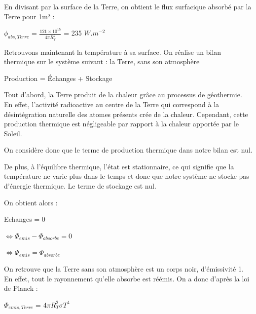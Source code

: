 \documentclass[a4paper, 12pt]{report} %
\begin{document}
En divisant par la surface de la Terre, 
on obtient le flux surfacique absorbé par la Terre pour 1m² :
\begin{center}
$\phi_{abs,Terre}$ = $\frac {121 \times 10^{15}}{4 \pi R_T^{2}}$
= 235 $W.m^{-2}$
\end{center}

\par 
\vspace{\baselineskip}
\vspace{\baselineskip}

Retrouvons maintenant la température à sa surface.
On réalise un bilan thermique sur le système suivant : 
la Terre, sans son atmosphère
\begin{center}
    Production = Échanges + Stockage 
\end{center} \vspace{\baselineskip}

Tout d'abord, la Terre produit de la chaleur grâce au processus de géothermie. En effet, l’activité radioactive au centre de la Terre qui correspond à la désintégration naturelle des atomes présents crée de la chaleur. 
Cependant, cette production thermique est négligeable par rapport à la chaleur apportée par le Soleil. 

\noindent On considère donc que le terme de production thermique dans notre bilan est nul. \vspace{\baselineskip}

De plus, à l’équilibre thermique, l’état est stationnaire, ce qui signifie que la température ne varie plus dans le temps et donc que notre système ne stocke pas d’énergie thermique. Le terme de stockage est nul.

\noindent On obtient alors :
\begin{center}
    Echanges = 0
\end{center}

\begin{center}
    $\Leftrightarrow \Phi_{emis} - \Phi_{absorbe}  = 0$
\end{center}

\begin{center}
    $\Leftrightarrow \Phi_{emis} = \Phi_{absorbe}$
\end{center} \vspace{\baselineskip}

On retrouve que la Terre sans son atmosphère est un corps noir, d’émissivité 1. En effet, tout le rayonnement qu’elle absorbe est réémis. On a donc d'après la loi de Planck :
\begin{center}
$\Phi_{emis,Terre}$ = $4 \pi R_T^{2} \sigma T^{4}$
\end{center} \vspace{\baselineskip}
\end{document}
